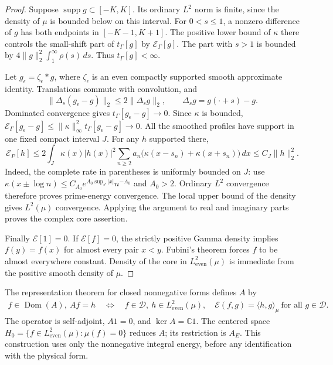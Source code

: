 \documentclass[11pt,a4paper]{article}
\numberwithin{equation}{section}
\theoremstyle{remark}
\newcommand{\C}{\mathbb C}
\newcommand{\E}{\mathcal E}
\newcommand{\D}{\mathcal D}
\newcommand{\He}{L^2_{\mathrm{even}}(\mu)}
\newcommand{\tg}{t_{\Gamma}}
\newcommand{\dom}{\operatorname{Dom}}
\newcommand{\supp}{\operatorname{supp}}
\newcommand{\ip}[2]{\langle #1,#2\rangle}
\newcommand{\norm}[1]{\lVert #1\rVert}
\begin{document}
\begin{proof}
Suppose $\supp g\subset[-K,K]$. Its ordinary $L^2$ norm is finite, since the density of $\mu$ is bounded below on this interval. For $0<s\le1$, a nonzero difference of $g$ has both endpoints in $[-K-1,K+1]$. The positive lower bound of $\kappa$ there controls the small-shift part of $\tg[g]$ by $\E_\Gamma[g]$. The part with $s>1$ is bounded by $4\norm{g}_2^2\int_1^\infty\rho(s)\,ds$. Thus $\tg[g]<\infty$.

Let $g_\epsilon=\zeta_\epsilon*g$, where $\zeta_\epsilon$ is an even compactly supported smooth approximate identity. Translations commute with convolution, and
\[
 \norm{\Delta_s(g_\epsilon-g)}_2\le2\norm{\Delta_sg}_2,
 \qquad\Delta_sg=g(\cdot+s)-g.
\]
Dominated convergence gives $\tg[g_\epsilon-g]\to0$. Since $\kappa$ is bounded,
$\E_\Gamma[g_\epsilon-g]\le\norm{\kappa}_\infty^2\tg[g_\epsilon-g]\to0$.
All the smoothed profiles have support in one fixed compact interval $J$. For any $h$ supported there,
\begin{equation}\label{eq:compactprimerate}
 \E_P[h]\le2\int_J\kappa(x)|h(x)|^2
     \sum_{n\ge2}a_n\bigl(\kappa(x-s_n)+\kappa(x+s_n)\bigr)\,dx
 \le C_J\norm{h}_2^2.
\end{equation}
Indeed, the complete rate in parentheses is uniformly bounded on $J$: use $\kappa(x\pm\log n)\le C_{A_0}e^{A_0\sup_J|x|}n^{-A_0}$ and $A_0>2$. Ordinary $L^2$ convergence therefore proves prime-energy convergence. The local upper bound of the density gives $L^2(\mu)$ convergence. Applying the argument to real and imaginary parts proves the complex core assertion.

Finally $\E[1]=0$. If $\E[f]=0$, the strictly positive Gamma density implies $f(y)=f(x)$ for almost every pair $x<y$. Fubini's theorem forces $f$ to be almost everywhere constant. Density of the core in $\He$ is immediate from the positive smooth density of $\mu$.
\end{proof}

The representation theorem for closed nonnegative forms \cite[Chapter~VI, Section~2]{Kato} defines $A$ by
\begin{equation}\label{eq:Adef}
 \begin{split}
 f\in\dom(A),\ Af=h\quad\Longleftrightarrow\quad
 f\in\D,\ h\in\He,\quad
 \E(f,g)=\ip{h}{g}_\mu\ \text{for all }g\in\D.
 \end{split}
\end{equation}
The operator is self-adjoint, $A1=0$, and $\ker A=\C1$. The centered space
$H_0=\{f\in\He:\mu(f)=0\}$ reduces $A$; its restriction is $A_E$. This construction uses only the nonnegative integral energy, before any identification with the physical form.
\end{document}
